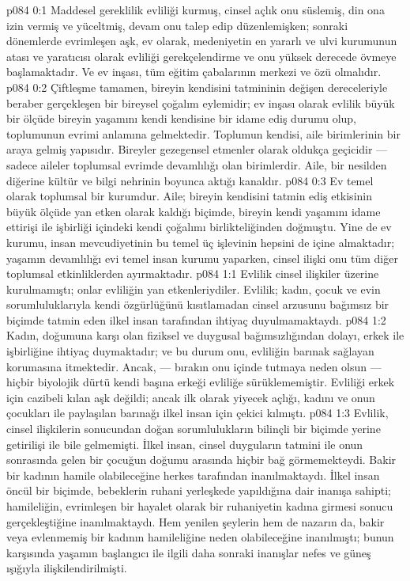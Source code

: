 \vs p084 0:1 Maddesel gereklilik evliliği kurmuş, cinsel açlık onu süslemiş, din ona izin vermiş ve yüceltmiş, devam onu talep edip düzenlemişken; sonraki dönemlerde evrimleşen aşk, ev olarak, medeniyetin en yararlı ve ulvi kurumunun atası ve yaratıcısı olarak evliliği gerekçelendirme ve onu yüksek derecede övmeye başlamaktadır. Ve ev inşası, tüm eğitim çabalarının merkezi ve özü olmalıdır.
\vs p084 0:2 Çiftleşme tamamen, bireyin kendisini tatmininin değişen dereceleriyle beraber gerçekleşen bir bireysel çoğalım eylemidir; ev inşası olarak evlilik büyük bir ölçüde bireyin yaşamını kendi kendisine bir idame ediş durumu olup, toplumunun evrimi anlamına gelmektedir. Toplumun kendisi, aile birimlerinin bir araya gelmiş yapısıdır. Bireyler gezegensel etmenler olarak oldukça geçicidir --- sadece aileler toplumsal evrimde devamlılığı olan birimlerdir. Aile, bir nesilden diğerine kültür ve bilgi nehrinin boyunca aktığı kanaldır.
\vs p084 0:3 Ev temel olarak toplumsal bir kurumdur. Aile; bireyin kendisini tatmin ediş etkisinin büyük ölçüde yan etken olarak kaldığı biçimde, bireyin kendi yaşamını idame ettirişi ile işbirliği içindeki kendi çoğalımı birlikteliğinden doğmuştu. Yine de ev kurumu, insan mevcudiyetinin bu temel üç işlevinin hepsini de içine almaktadır; yaşamın devamlılığı evi temel insan kurumu yaparken, cinsel ilişki onu tüm diğer toplumsal etkinliklerden ayırmaktadır.
\vs p084 1:1 Evlilik cinsel ilişkiler üzerine kurulmamıştı; onlar evliliğin yan etkenleriydiler. Evlilik; kadın, çocuk ve evin sorumluluklarıyla kendi özgürlüğünü kısıtlamadan cinsel arzusunu bağımsız bir biçimde tatmin eden ilkel insan tarafından ihtiyaç duyulmamaktaydı.
\vs p084 1:2 Kadın, doğumuna karşı olan fiziksel ve duygusal bağımsızlığından dolayı, erkek ile işbirliğine ihtiyaç duymaktadır; ve bu durum onu, evliliğin barınak sağlayan korumasına itmektedir. Ancak, --- bırakın onu içinde tutmaya neden olsun --- hiçbir biyolojik dürtü kendi başına erkeği evliliğe sürüklememiştir. Evliliği erkek için cazibeli kılan aşk değildi; ancak ilk olarak yiyecek açlığı, kadını ve onun çocukları ile paylaşılan barınağı ilkel insan için çekici kılmıştı.
\vs p084 1:3 Evlilik, cinsel ilişkilerin sonucundan doğan sorumlulukların bilinçli bir biçimde yerine getirilişi ile bile gelmemişti. İlkel insan, cinsel duyguların tatmini ile onun sonrasında gelen bir çocuğun doğumu arasında hiçbir bağ görmemekteydi. Bakir bir kadının hamile olabileceğine herkes tarafından inanılmaktaydı. İlkel insan öncül bir biçimde, bebeklerin ruhani yerleşkede yapıldığına dair inanışa sahipti; hamileliğin, evrimleşen bir hayalet olarak bir ruhaniyetin kadına girmesi sonucu gerçekleştiğine inanılmaktaydı. Hem yenilen şeylerin hem de nazarın da, bakir veya evlenmemiş bir kadının hamileliğine neden olabileceğine inanılmıştı; bunun karşısında yaşamın başlangıcı ile ilgili daha sonraki inanışlar nefes ve güneş ışığıyla ilişkilendirilmişti.
